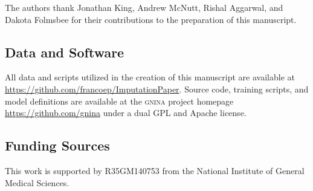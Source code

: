 \documentclass[journal=jcim,manuscript=article]{achemso}
\begin{document}
\begin{acknowledgement}

The authors thank Jonathan King, Andrew McNutt, Rishal Aggarwal, and Dakota Folmsbee for their contributions to the preparation of this manuscript.

\subsection{Data and Software}
All data and scripts utilized in the creation of this manuscript are available at \url{https://github.com/francoep/ImputationPaper}.
Source code, training scripts, and model definitions are available at the \textsc{gnina} project homepage \url{https://github.com/gnina} under a dual GPL and Apache license.

\subsection{Funding Sources}
This work is supported by R35GM140753 from the National Institute of General Medical Sciences.

\end{acknowledgement}




\end{document}
